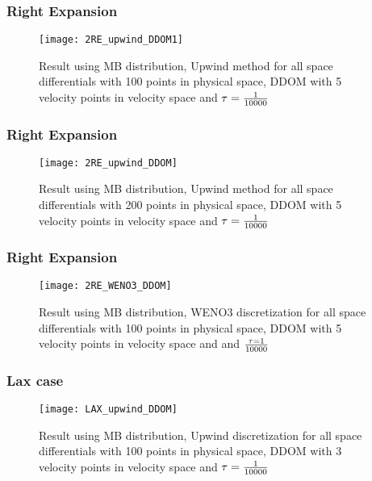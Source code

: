 
\begin{frame}
	\frametitle{Right Expansion}
		
		\begin{figure}
			\centering
				\texttt{[image: 2RE\_upwind\_DDOM1]}
			\caption{Result using MB distribution, Upwind method for all space differentials with 100 points in physical space, DDOM with 5 velocity points in velocity space and $\tau = {1 \over 10000}$}
			\label{fig:MB_RE_DDOM}
		\end{figure}
		
\end{frame}

\begin{frame}
	\frametitle{Right Expansion}
		
		\begin{figure}
			\centering
				\texttt{[image: 2RE\_upwind\_DDOM]}
			\caption{Result using MB distribution, Upwind method for all space differentials with 200 points in physical space, DDOM with 5 velocity points in velocity space and $\tau = {1 \over 10000}$}
			\label{fig:MB_RE_DDOM_2}
		\end{figure}
		
\end{frame}

\begin{frame}
	\frametitle{Right Expansion}
		
		\begin{figure}
			\centering
				\texttt{[image: 2RE\_WENO3\_DDOM]}
			\caption{Result using MB distribution, WENO3 discretization for all space differentials with 100 points in physical space, DDOM with 5 velocity points in velocity space and and $\tau = 1 \over 10000$}
			\label{fig:MB_RE_WENO_DDOM}
		\end{figure}
		
\end{frame}

\begin{frame}
	\frametitle{Lax case}
		
		\begin{figure}
			\centering
				\texttt{[image: LAX\_upwind\_DDOM]}
			\caption{Result using MB distribution, Upwind discretization for all space differentials with 100 points in physical space, DDOM with 3 velocity points in velocity space and $\tau = {1 \over 10000}$}
			\label{fig:MB_Lax_DDOM}
		\end{figure}
		
\end{frame}

